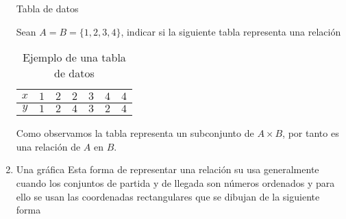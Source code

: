 \begin{enumerate}
\begin{table}[H]
\caption{Tabla de datos}
\end{table}
\begin{ejem}{} Sean $A=B=\{1,2,3,4\}$, indicar si la siguiente tabla
representa una relación
\begin{table}[H]
\centering%
\begin{tabular}{|c|c|c|c|c|c|c|}
\hline 
$x$ & $1$ & $2$ & $2$ & $3$ & $4$ & $4$\tabularnewline
\hline 
\hline 
$y$ & $1$ & $2$ & $4$ & $3$ & $2$ & $4$\tabularnewline
\hline 
\end{tabular}

\caption{Ejemplo de una tabla de datos}
\end{table}
\end{ejem}Como observamos la tabla representa un subconjunto de $A\times B$,
por tanto es una relación de $A$ en $B.$
\item Una gráfica\medskip{}
Esta forma de representar una relación su usa generalmente cuando
los conjuntos de partida y de llegada son números ordenados y para
ello se usan las coordenadas rectangulares que se dibujan de la siguiente
forma 


\end{enumerate}
